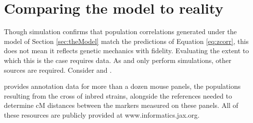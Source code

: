\documentclass{article}
\newcommand{\code}[1]{\texttt{#1}}
\newcommand{\ve}[1]{\mathbf{#1}}           %
\begin{document}



\section{Comparing the model to reality} \label{sec:model2real}

Though simulation confirms that population correlations generated under the model of Section \ref{sec:theModel} match the predictions of Equation \ref{eq:zcorr}, this does not mean it reflects genetic mechanics with fidelity. Evaluating the extent to which this is the case requires data. As \cite{LanderBotstein1989} and \cite{cheverud2001} only perform simulations, other sources are required. Consider \cite{cheverudetal2001} and \cite{bultetal2019mouse}.

\cite{bultetal2019mouse} provides annotation data for more than a dozen mouse panels, the populations resulting from the cross of inbred strains, alongside the references needed to determine cM distances between the markers measured on these panels. All of these resources are publicly provided at www.informatics.jax.org.
\end{document}
